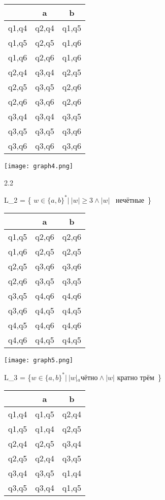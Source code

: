\documentclass{article}
\begin{document}
\begin{tabular}{ | c | c | c | }
\hline
 & a & b  \\ \hline
q1,q4 & q2,q4 & q1,q5 \\ \hline
q1,q5 & q2,q5 & q1,q6  \\ \hline
q1,q6 & q2,q6 & q1,q6 \\ \hline
q2,q4 & q3,q4 & q2,q5 \\ \hline
q2,q5 & q3,q5 & q2,q6 \\ \hline
q2,q6 & q3,q6 & q2,q6 \\ \hline
q3,q4 & q3,q4 & q3,q5 \\ \hline
q3,q5 & q3,q5 & q3,q6 \\ \hline
q3,q6 & q3,q6 & q3,q6 \\
\hline
\end{tabular}

\texttt{[image: graph4.png]}

\newpage

2.2

L_2 = \{ \(w \in \{a,b\}^* | \ |w| \geq 3 \land |w|\) \ нечётные\ \}


\begin{tabular}{ | c | c | c | }
\hline
 & a & b  \\ \hline
q1,q5 & q2,q6 & q2,q6 \\ \hline
q1,q6 & q2,q5 & q2,q5  \\ \hline
q2,q5 & q3,q6 & q3,q6 \\ \hline
q2,q6 & q3,q5 & q3,q5 \\ \hline
q3,q5 & q4,q6 & q4,q6 \\ \hline
q3,q6 & q4,q5 & q4,q5 \\ \hline
q4,q5 & q4,q6 & q4,q6 \\ \hline
q4,q6 & q4,q5 & q4,q5 \\ \hline
\end{tabular}


\texttt{[image: graph5.png]}


L_3 = \{\( w \in \{a,b\}^* | \ |w|_a чётно \land |w| \) кратно трём\ \}

\begin{tabular}{ | c | c | c | }
\hline
 & a & b  \\ \hline
q1,q4 & q1,q5 & q2,q4 \\ \hline
q1,q5 & q1,q4 & q2,q5  \\ \hline
q2,q4 & q2,q5 & q3,q4 \\ \hline
q2,q5 & q2,q4 & q3,q5 \\ \hline
q3,q4 & q3,q5 & q1,q4 \\ \hline
q3,q5 & q3,q4 & q1,q5 \\ \hline
\end{tabular}
\end{document}
